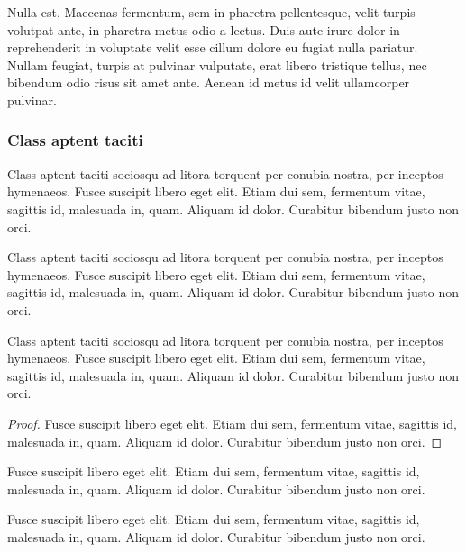 Nulla est. Maecenas fermentum, sem in pharetra pellentesque, velit turpis volutpat ante, in pharetra metus odio a lectus. Duis aute irure dolor in reprehenderit in voluptate velit esse cillum dolore eu fugiat nulla pariatur. Nullam feugiat, turpis at pulvinar vulputate, erat libero tristique tellus, nec bibendum odio risus sit amet ante. Aenean id metus id velit ullamcorper pulvinar. 

\subsubsection{Class aptent taciti}

\begin{definition}
Class aptent taciti sociosqu ad litora torquent per conubia nostra, per inceptos hymenaeos. Fusce suscipit libero eget elit. Etiam dui sem, fermentum vitae, sagittis id, malesuada in, quam. Aliquam id dolor. Curabitur bibendum justo non orci.
\end{definition}

\begin{example}
Class aptent taciti sociosqu ad litora torquent per conubia nostra, per inceptos hymenaeos. Fusce suscipit libero eget elit. Etiam dui sem, fermentum vitae, sagittis id, malesuada in, quam. Aliquam id dolor. Curabitur bibendum justo non orci.
\end{example}

\begin{theorem}
Class aptent taciti sociosqu ad litora torquent per conubia nostra, per inceptos hymenaeos. Fusce suscipit libero eget elit. Etiam dui sem, fermentum vitae, sagittis id, malesuada in, quam. Aliquam id dolor. Curabitur bibendum justo non orci.
\end{theorem}

\begin{proof}
Fusce suscipit libero eget elit. Etiam dui sem, fermentum vitae, sagittis id, malesuada in, quam. Aliquam id dolor. Curabitur bibendum justo non orci.
\end{proof}

\begin{corollary}
Fusce suscipit libero eget elit. Etiam dui sem, fermentum vitae, sagittis id, malesuada in, quam. Aliquam id dolor. Curabitur bibendum justo non orci.
\end{corollary}

\begin{proposition}
Fusce suscipit libero eget elit. Etiam dui sem, fermentum vitae, sagittis id, malesuada in, quam. Aliquam id dolor. Curabitur bibendum justo non orci.
\end{proposition}

